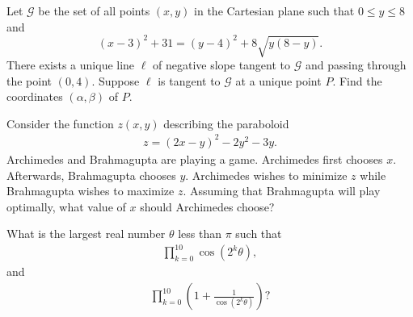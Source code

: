\begin{question}[name={2015 HMMT, Geometry, \href{https://artofproblemsolving.com/community/c129h1358805p7440443}{Problem 10}}]
	Let $\mathcal{G}$ be the set of all points $(x,y)$ in the Cartesian plane such that $0\le y\le 8$ and$$(x-3)^2+31=(y-4)^2+8\sqrt{y(8-y)}.$$There exists a unique line $\ell$ of negative slope tangent to $\mathcal{G}$ and passing through the point $(0,4)$. Suppose $\ell$ is tangent to $\mathcal{G}$ at a unique point $P$. Find the coordinates $(\alpha, \beta)$ of $P$.
\end{question}



%	





\begin{question}[name={2015 HMMT, Guts, Problem 4}]
	Consider the function $z(x,y)$ describing the paraboloid
	\begin{align*}
		z = (2x-y)^2 - 2y^2 - 3y.
	\end{align*}
	Archimedes and Brahmagupta are playing a game. Archimedes first chooses $x$. Afterwards, Brahmagupta chooses $y$. Archimedes wishes to minimize $z$ while Brahmagupta wishes to maximize $z$. Assuming that Brahmagupta will play optimally, what value of $x$ should Archimedes choose?
\end{question}


%	





\begin{question}[name={2015 HMMT, Guts, Problem 20}]
	What is the largest real number $\theta$ less than $\pi$ such that
	\begin{align*}
		\prod_{k=0}^{10} \cos\left(2^k\theta\right),
	\end{align*}
	and
	\begin{align*}
		\prod_{k=0}^{10} \left(1 + \frac{1}{\cos(2^k\theta)}\right)?
	\end{align*}
\end{question}


%	



